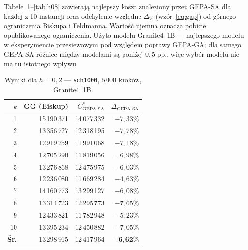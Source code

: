\documentclass[11pt,a4paper]{article}
\begin{document}
Tabele~\ref{tab:h02}--\ref{tab:h08} zawierają najlepszy koszt znaleziony przez
GEPA-SA dla każdej z 10 instancji oraz odchylenie względne $\Delta_{\%}$
(wzór~\ref{eq:gap}) od górnego ograniczenia Biskupa i Feldmanna.
Wartość ujemna oznacza pobicie opublikowanego ograniczenia.
Użyto modelu Granite4~1B — najlepszego modelu w eksperymencie przesiewowym
pod względem poprawy GEPA-GA; dla samego GEPA-SA różnice między modelami
są poniżej $0{,}5$ pp., więc wybór modelu nie ma tu istotnego wpływu.

\begin{table}[ht]
\centering
\caption{Wyniki dla $h = 0{,}2$ — \texttt{sch1000}, 5\,000 kroków, Granite4~1B.}
\label{tab:h02}
\begin{tabular}{@{}rrrr@{}}
\toprule
$k$ & GG (Biskup) & $C^*_{\text{GEPA-SA}}$ & $\Delta_{\text{GEPA-SA}}$ \\
\midrule
 1 & 15\,190\,371 & 14\,077\,332 & $-7{,}33\%$ \\
 2 & 13\,356\,727 & 12\,318\,195 & $-7{,}78\%$ \\
 3 & 12\,919\,259 & 11\,991\,068 & $-7{,}18\%$ \\
 4 & 12\,705\,290 & 11\,819\,056 & $-6{,}98\%$ \\
 5 & 13\,276\,868 & 12\,475\,975 & $-6{,}03\%$ \\
 6 & 12\,236\,080 & 11\,669\,284 & $-4{,}63\%$ \\
 7 & 14\,160\,773 & 13\,299\,127 & $-6{,}08\%$ \\
 8 & 13\,314\,723 & 12\,295\,773 & $-7{,}65\%$ \\
 9 & 12\,433\,821 & 11\,782\,948 & $-5{,}23\%$ \\
10 & 13\,395\,234 & 12\,450\,882 & $-7{,}05\%$ \\
\midrule
\textbf{Śr.} & 13\,298\,915 & 12\,417\,964 & $\mathbf{-6{,}62\%}$ \\
\bottomrule
\end{tabular}
\end{table}
\end{document}
